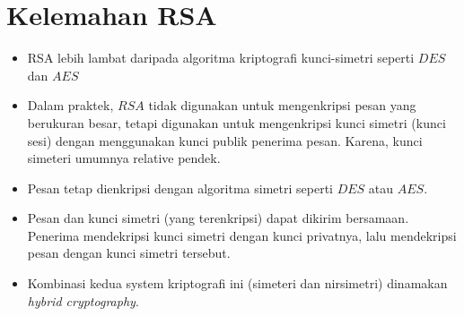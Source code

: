\documentclass{article}
\begin{document}

\section*{Kelemahan RSA}

\begin{itemize}
    \item RSA lebih lambat daripada algoritma kriptografi kunci-simetri seperti $DES$ dan $AES$
    \item Dalam praktek, $RSA$ tidak digunakan untuk mengenkripsi pesan yang berukuran besar, tetapi digunakan untuk mengenkripsi kunci simetri (kunci sesi) dengan menggunakan kunci publik penerima pesan. Karena, kunci simeteri umumnya relative pendek.
    \item Pesan tetap dienkripsi dengan algoritma simetri seperti $DES$ atau $AES$.
    \item Pesan dan kunci simetri (yang terenkripsi) dapat dikirim bersamaan. Penerima mendekripsi kunci simetri dengan kunci privatnya, lalu mendekripsi pesan dengan kunci simetri tersebut.
    \item Kombinasi kedua system kriptografi ini (simeteri dan nirsimetri) dinamakan \textit{hybrid cryptography}.
\end{itemize}
\end{document}
